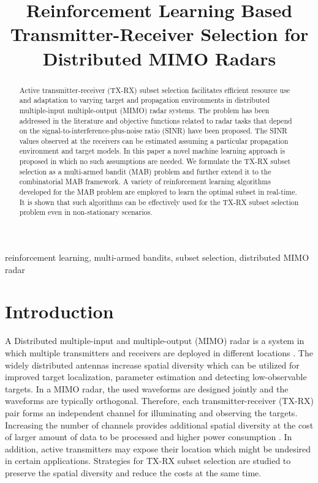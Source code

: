 \documentclass[conference]{IEEEtran}
\title{Reinforcement Learning Based Transmitter-Receiver Selection for Distributed MIMO Radars}
\author{
	\IEEEauthorblockN{
        Petteri~Pulkkinen,
	    Tuomas~Aittom\"aki, and
        Visa~Koivunen%
	}
	\IEEEauthorblockA{
		Department of Signal Processing and Acoustics, \\
		Aalto University \\
		PO Box 15400, FI-00076 Aalto, Finland \\
	}
}
\begin{document}
\maketitle

\begin{abstract}

Active transmitter-receiver (TX-RX) subset selection facilitates efficient resource use and adaptation to varying target and propagation environments in distributed multiple-input multiple-output (MIMO) radar systems.
The problem has been addressed in the literature and objective functions related to radar tasks that depend on the signal-to-interference-plus-noise ratio (SINR) have been proposed. 
The SINR values observed at the receivers can be estimated assuming a particular propagation environment and target models. 
In this paper a novel machine learning approach is proposed in which no such assumptions are needed.
We formulate the TX-RX subset selection as a multi-armed bandit (MAB) problem and further extend it to the combinatorial MAB framework.
A variety of reinforcement learning algorithms developed for the MAB problem are employed to learn the optimal subset in real-time.
It is shown that such algorithms can be effectively used for the TX-RX subset selection problem even in non-stationary scenarios.

\end{abstract}

\begin{IEEEkeywords}
reinforcement learning, multi-armed bandits, subset selection, distributed MIMO radar
\end{IEEEkeywords}


\section{Introduction}
\label{sec:intro}

A Distributed multiple-input and multiple-output (MIMO) radar is a system in which multiple transmitters and receivers are deployed in different locations \cite{Haimovich2008}.
The widely distributed antennas increase spatial diversity which can be utilized for improved target localization, parameter estimation and detecting low-observable targets.
In a MIMO radar, the used waveforms are designed jointly and the waveforms are typically orthogonal.
Therefore, each transmitter-receiver (TX-RX) pair forms an independent channel for illuminating and observing the targets.
Increasing the number of channels provides additional spatial diversity at the cost of larger amount of data to be processed and higher power consumption \cite{Godrich2011, Sun2014, Aittomaeki2011}.
In addition, active transmitters may expose their location which might be undesired in certain applications.
Strategies for TX-RX subset selection are studied to preserve the spatial diversity and reduce the costs at the same time.
\end{document}
